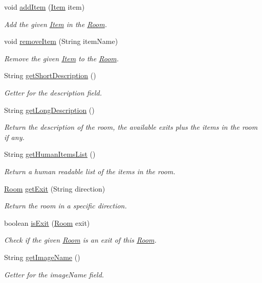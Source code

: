 \begin{DoxyCompactItemize}
void \hyperlink{classRoom_a0b4fcc1c1c04e60efa7ae5f82ea37157}{add\-Item} (\hyperlink{classItem}{Item} item)
\begin{DoxyCompactList}\small\item\em Add the given \hyperlink{classItem}{Item} in the \hyperlink{classRoom}{Room}. \end{DoxyCompactList}\item 
void \hyperlink{classRoom_a591912d92553130f8f90a5bebd236a5c}{remove\-Item} (String item\-Name)
\begin{DoxyCompactList}\small\item\em Remove the given \hyperlink{classItem}{Item} to the \hyperlink{classRoom}{Room}. \end{DoxyCompactList}\item 
String \hyperlink{classRoom_a85e561bc5fa9d9c965300e9ad264b02a}{get\-Short\-Description} ()
\begin{DoxyCompactList}\small\item\em Getter for the description field. \end{DoxyCompactList}\item 
String \hyperlink{classRoom_a23a25854d7544fb0b41190a4d6bd1322}{get\-Long\-Description} ()
\begin{DoxyCompactList}\small\item\em Return the description of the room, the available exits plus the items in the room if any. \end{DoxyCompactList}\item 
String \hyperlink{classRoom_ab8a87ad306f77a936873094b479bcde8}{get\-Human\-Items\-List} ()
\begin{DoxyCompactList}\small\item\em Return a human readable list of the items in the room. \end{DoxyCompactList}\item 
\hyperlink{classRoom}{Room} \hyperlink{classRoom_a384ab8c844e5775f87de24d6c470637e}{get\-Exit} (String direction)
\begin{DoxyCompactList}\small\item\em Return the room in a specific direction. \end{DoxyCompactList}\item 
boolean \hyperlink{classRoom_a844b42638a0d2ce68df9adf1674f713b}{is\-Exit} (\hyperlink{classRoom}{Room} exit)
\begin{DoxyCompactList}\small\item\em Check if the given \hyperlink{classRoom}{Room} is an exit of this \hyperlink{classRoom}{Room}. \end{DoxyCompactList}\item 
String \hyperlink{classRoom_a8177668df4d8be718812934673c42649}{get\-Image\-Name} ()
\begin{DoxyCompactList}\small\item\em Getter for the image\-Name field. \end{DoxyCompactList}\end{DoxyCompactItemize}
